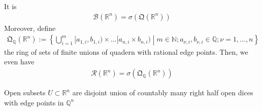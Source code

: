 \begin{theorem}
    It is
    \begin{align}
        \mathcal{B}(\mathbb{R}^n) = \sigma(\mathfrak{Q}(\mathbb{R}^n))
    \end{align}
    Moreover, define
    \begin{align}
        \mathfrak{Q}_{\mathbb{Q}}(\mathbb{R}^n) := \left\{ \bigcup_{i=1}^m [a_{1, i}, b_{1, i}) \times \dots [a_{n, i} \times b_{n, i}) \middle| m \in \mathbb{N}; a_{\nu, i}, b_{\nu, i} \in \mathbb{Q}; \nu = 1, \dots, n \right\}
    \end{align}
    the ring of sets of finite unions of quadern with rational edge points. Then, we even have
    \begin{align}
        \mathcal{R}(\mathbb{R}^n) = \sigma( \mathfrak{Q}_{\mathbb{Q}} (\mathbb{R}^n))
    \end{align}
\end{theorem}
\begin{lemma}
    Open subsets \(U \subset \mathbb{R}^n\) are disjoint union of countably many right half open dices with edge points in \(\mathbb{Q}^n\)
\end{lemma}
%
%
%
